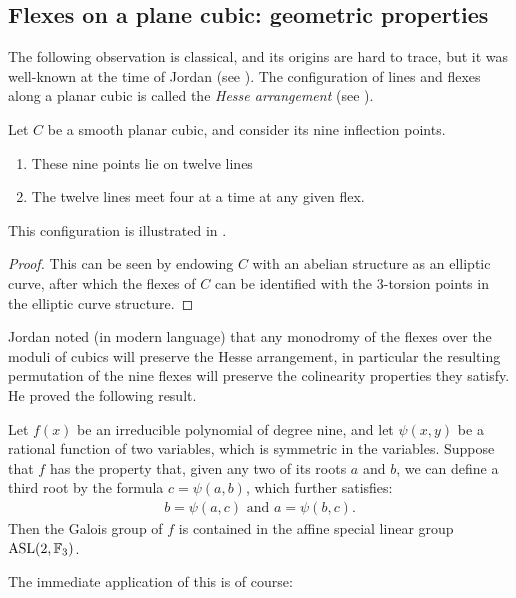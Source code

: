 \documentclass[11pt]{amsart}
\providecommand{\ASL}{\mathrm{ASL}}
\begin{document}
\subsection{Flexes on a plane cubic: geometric properties}

The following observation is classical, and its origins are hard to trace, but it was well-known at the time of Jordan (see \cite[p.~302]{Jordan}). The configuration of lines and flexes along a planar cubic is called the \textit{Hesse arrangement} (see \cite[p.~118]{Dolgachev}).

\begin{proposition} Let $C$ be a smooth planar cubic, and consider its nine inflection points.
\begin{enumerate}
    \item These nine points lie on twelve lines
    \item The twelve lines meet four at a time at any given flex.
\end{enumerate}
This configuration is illustrated in .
\end{proposition}
\begin{proof} This can be seen by endowing $C$ with an abelian structure as an elliptic curve, after which the flexes of $C$ can be identified with the $3$-torsion points in the elliptic curve structure.
\end{proof}

Jordan noted (in modern language) that any monodromy of the flexes over the moduli of cubics will preserve the Hesse arrangement, in particular the resulting permutation of the nine flexes will preserve the colinearity properties they satisfy. He proved the following result.

\begin{theorem} Let $f(x)$ be an irreducible polynomial of degree nine, and let $\psi(x,y)$ be a rational function of two variables, which is symmetric in the variables. Suppose that $f$ has the property that, given any two of its roots $a$ and $b$, we can define a third root by the formula $c = \psi(a,b)$, which further satisfies:
\begin{align*}
    b = \psi(a,c) \text{ and } a = \psi(b,c).
\end{align*}
Then the Galois group of $f$ is contained in the affine special linear group $\ASL(2,\F_3)$.
\end{theorem}

The immediate application of this is of course:
\end{document}
